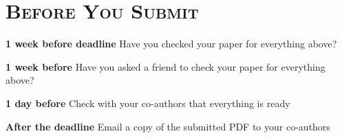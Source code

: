 \noindent\makebox[\linewidth]{\rule{\linewidth}{0.4pt}}
\section*{\textsc{Before You Submit }}
\begin{checklist}
    \item \textbf{1 week before deadline} Have you checked your paper for everything above? 
    \item \textbf{1 week before} Have you asked a friend to check your paper for everything above? 
    \item \textbf{1 day before} Check with your co-authors that everything is ready
    \item \textbf{After the deadline} Email a copy of the submitted PDF to your co-authors
\end{checklist}





\newpage
